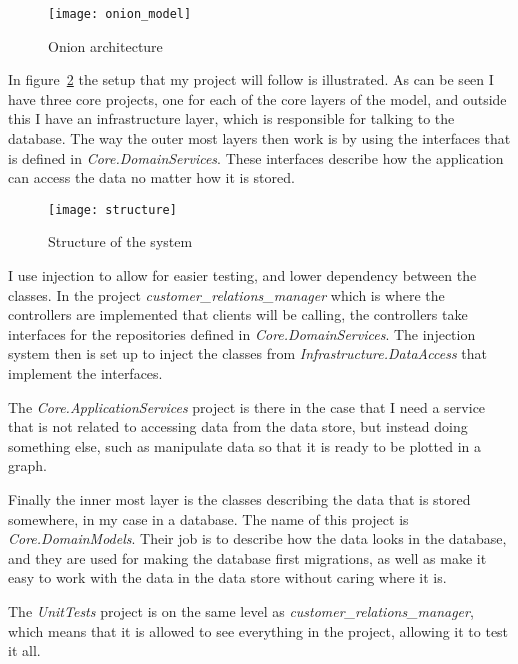 \begin{figure}[h]
  \centering
  \texttt{[image: onion\_model]}
  \caption[Onion architecture]{Onion architecture\protect\footnotemark}
  \label{fig:Onion architecture}
\end{figure}

In figure~\ref{fig:structure} the setup that my project will follow is
illustrated. As can be seen I have three core projects, one for each of the core
layers of the model, and outside this I have an infrastructure layer, which is
responsible for talking to the database. The way the outer most layers then work
is by using the interfaces that is defined in \textit{Core.DomainServices}.
These interfaces describe how the application can access the data no matter how it is
stored. 

\begin{figure}[h]
  \centering
  \texttt{[image: structure]}
  \caption{Structure of the system}
  \label{fig:structure}
\end{figure}

I use injection to allow for easier testing, and lower dependency between the
classes. In the project \textit{customer\_relations\_manager}
which is where the controllers are implemented that clients will be calling, the
controllers take interfaces for the repositories defined in
\textit{Core.DomainServices}. The injection system then is set up to inject the
classes from \textit{Infrastructure.DataAccess} that implement the interfaces. 

The \textit{Core.ApplicationServices} project is there in the case that I need a
service that is not related to accessing data from the data store, but instead
doing something else, such as manipulate data so that it is ready to be plotted
in a graph.

Finally the inner most layer is the classes describing the data that is stored
somewhere, in my case in a database. The name of this project is
\textit{Core.DomainModels}. Their job is to describe how the data looks in the
database, and they are used for making the database first migrations, as well as
make it easy to work with the data in the data store without caring where it is.

The \textit{UnitTests} project is on the same level as
\textit{customer\_relations\_manager}, which means that it is allowed to see
everything in the project, allowing it to test it all. 


